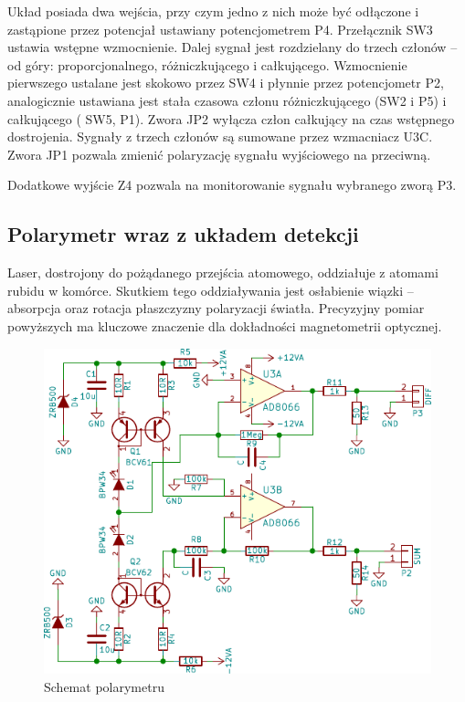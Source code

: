 \documentclass[a4paper,10pt]{article}
\begin{document}
Układ posiada dwa wejścia, przy czym jedno z nich może być odłączone i zastąpione przez potencjał ustawiany potencjometrem P4. Przełącznik SW3 ustawia wstępne wzmocnienie.
Dalej sygnał jest rozdzielany do trzech członów -- od góry: proporcjonalnego, różniczkującego i całkującego.
Wzmocnienie pierwszego ustalane jest skokowo przez SW4 i płynnie przez potencjometr P2, analogicznie ustawiana jest stała czasowa członu różniczkującego (SW2 i P5) i całkującego ( SW5, P1). Zwora JP2 wyłącza człon całkujący na czas wstępnego dostrojenia.
Sygnały z trzech członów są sumowane przez wzmacniacz U3C. Zwora JP1 pozwala zmienić polaryzację sygnału wyjściowego na przeciwną.

Dodatkowe wyjście Z4 pozwala na monitorowanie sygnału wybranego zworą P3.

\subsection{Polarymetr wraz z układem detekcji}

Laser, dostrojony do pożądanego przejścia atomowego, oddziałuje z atomami rubidu w komórce.
Skutkiem tego oddziaływania jest osłabienie wiązki -- absorpcja oraz rotacja płaszczyzny polaryzacji światła.
Precyzyjny pomiar powyższych ma kluczowe znaczenie dla dokładności magnetometrii optycznej.

\begin{figure}
\begin{center}
 \includegraphics{./obrazki/polarymetr.pdf}
\end{center}
\caption{Schemat polarymetru}
\label{sch-mod}
\end{figure}
\end{document}
